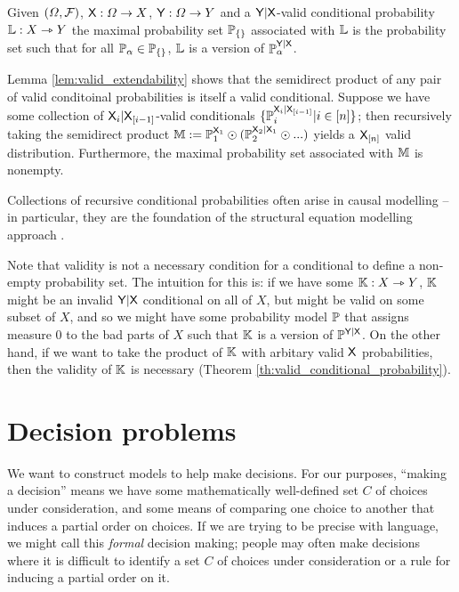 \begin{definition}
Given $(\Omega,\mathcal{F})$, $\mathsf{X}:\Omega\to X$, $\mathsf{Y}:\Omega\to Y$ and a $\mathsf{Y}|\mathsf{X}$-valid conditional probability $\mathbb{L}:X\rightarrowtriangle Y$ the maximal probability set $\mathbb{P}_{\{\}}$ associated with $\mathbb{L}$ is the probability set such that for all $\mathbb{P}_\alpha\in \mathbb{P}_{\{\}}$, $\mathbb{L}$ is a version of $\mathbb{P}_\alpha^{\mathsf{Y}|\mathsf{X}}$.
\end{definition}

Lemma \ref{lem:valid_extendability} shows that the semidirect product of any pair of valid conditoinal probabilities is itself a valid conditional. Suppose we have some collection of $\mathsf{X}_i|\mathsf{X}_{[i-1]}$-valid conditionals $\{\mathbb{P}_i^{\mathsf{X}_i|\mathsf{X}_{[i-1]}}|i\in [n]\}$; then recursively taking the semidirect product $\mathbb{M}:=\mathbb{P}_1^{\mathsf{X}_1}\odot (\mathbb{P}_2^{\mathsf{X}_2|\mathsf{X}_{1}}\odot ...)$ yields a $\mathsf{X}_{[n]}$ valid distribution. Furthermore, the maximal probability set associated with $\mathbb{M}$ is nonempty.

Collections of recursive conditional probabilities often arise in causal modelling -- in particular, they are the foundation of the structural equation modelling approach \citet{richardson2013single,pearl_causality:_2009}.

Note that validity is not a necessary condition for a conditional to define a non-empty probability set. The intuition for this is: if we have some $\mathbb{K}:X\rightarrowtriangle Y$, $\mathbb{K}$ might be an invalid $\mathsf{Y}|\mathsf{X}$ conditional on all of $X$, but might be valid on some subset of $X$, and so we might have some probability model $\mathbb{P}$ that assigns measure 0 to the bad parts of $X$ such that $\mathbb{K}$ is a version of $\mathbb{P}^{\mathsf{Y}|\mathsf{X}}$. On the other hand, if we want to take the product of $\mathbb{K}$ with arbitary valid $\mathsf{X}$ probabilities, then the validity of $\mathbb{K}$ is necessary (Theorem \ref{th:valid_conditional_probability}).

\section{Decision problems}

We want to construct models to help make decisions. For our purposes, ``making a decision'' means we have some mathematically well-defined set $C$ of choices under consideration, and some means of comparing one choice to another that induces a partial order on choices. If we are trying to be precise with language, we might call this \emph{formal} decision making; people may often make decisions where it is difficult to identify a set $C$ of choices under consideration or a rule for inducing a partial order on it.

